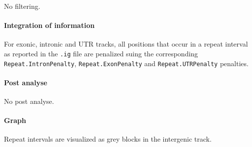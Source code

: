 No filtering.

\paragraph{Integration of information}

For exonic, intronic and UTR tracks, all positions that occur in a
repeat interval as reported in the \texttt{.ig} file are penalized
suing the corresponding \texttt{Repeat.IntronPenalty},
\texttt{Repeat.ExonPenalty} and \texttt{Repeat.UTRPenalty} penalties.

\paragraph{Post analyse}

No post analyse.

\paragraph{Graph}

Repeat intervals are visualized as grey blocks in the intergenic
track.




